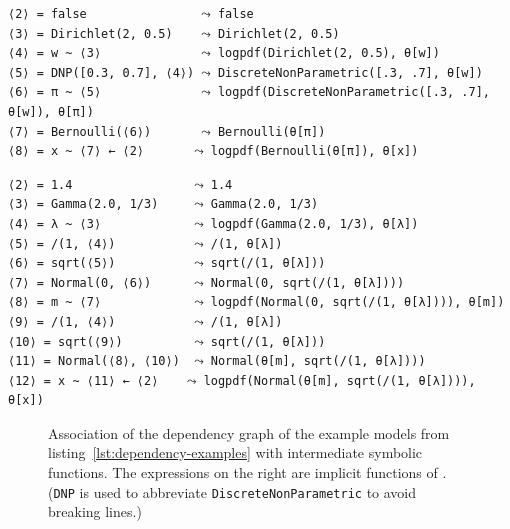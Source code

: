 \newsavebox{\bmlikelihoods}
\begin{lrbox}{\bmlikelihoods}
\begin{lstlisting}[style=lstfloat]
⟨2⟩ = false                ⤳ false
⟨3⟩ = Dirichlet(2, 0.5)    ⤳ Dirichlet(2, 0.5)
⟨4⟩ = w ~ ⟨3⟩              ⤳ logpdf(Dirichlet(2, 0.5), θ[w])
⟨5⟩ = DNP([0.3, 0.7], ⟨4⟩) ⤳ DiscreteNonParametric([.3, .7], θ[w])
⟨6⟩ = π ~ ⟨5⟩              ⤳ logpdf(DiscreteNonParametric([.3, .7], θ[w]), θ[π])
⟨7⟩ = Bernoulli(⟨6⟩)       ⤳ Bernoulli(θ[π])
⟨8⟩ = x ~ ⟨7⟩ ← ⟨2⟩       ⤳ logpdf(Bernoulli(θ[π]), θ[x])
\end{lstlisting}
\end{lrbox}
\newsavebox{\hglikelihoods}
\begin{lrbox}{\hglikelihoods}
\begin{lstlisting}[style=lstfloat]
⟨2⟩ = 1.4                 ⤳ 1.4
⟨3⟩ = Gamma(2.0, 1/3)     ⤳ Gamma(2.0, 1/3)
⟨4⟩ = λ ~ ⟨3⟩             ⤳ logpdf(Gamma(2.0, 1/3), θ[λ])
⟨5⟩ = /(1, ⟨4⟩)           ⤳ /(1, θ[λ])
⟨6⟩ = sqrt(⟨5⟩)           ⤳ sqrt(/(1, θ[λ]))
⟨7⟩ = Normal(0, ⟨6⟩)      ⤳ Normal(0, sqrt(/(1, θ[λ])))
⟨8⟩ = m ~ ⟨7⟩             ⤳ logpdf(Normal(0, sqrt(/(1, θ[λ]))), θ[m])
⟨9⟩ = /(1, ⟨4⟩)           ⤳ /(1, θ[λ])
⟨10⟩ = sqrt(⟨9⟩)          ⤳ sqrt(/(1, θ[λ]))
⟨11⟩ = Normal(⟨8⟩, ⟨10⟩)  ⤳ Normal(θ[m], sqrt(/(1, θ[λ])))
⟨12⟩ = x ~ ⟨11⟩ ← ⟨2⟩    ⤳ logpdf(Normal(θ[m], sqrt(/(1, θ[λ]))), θ[x])
\end{lstlisting}
\end{lrbox}
\begin{figure}[t]
  \loosesubcaptions
  \begin{minipage}{1.0\linewidth}
    \usebox{\bmlikelihoods}
  \end{minipage}
  \par\vspace{\baselineskip}
  \begin{minipage}{1.0\linewidth}
    \usebox{\hglikelihoods}
  \end{minipage}
  \par\vspace{\baselineskip}
  \caption{Association of the dependency graph of the example models from
    listing~\ref{lst:dependency-examples} with intermediate symbolic functions.  The expressions on
    the right are implicit functions of \protect{}.  (\texttt{DNP} is used to abbreviate
    \texttt{DiscreteNonParametric} to avoid breaking lines.)}
  \label{fig:continuations}
\end{figure}

